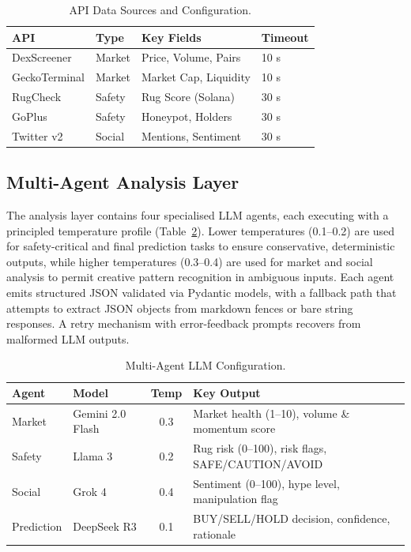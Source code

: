 \documentclass[12pt,a4paper,oneside,openany]{book}
\begin{document}
\begin{table}[H]
\centering
\caption{API Data Sources and Configuration.}
\label{tab:api}
\begin{tabular}{@{}llll@{}}
\toprule
\textbf{API} & \textbf{Type} & \textbf{Key Fields} & \textbf{Timeout} \\
\midrule
DexScreener & Market & Price, Volume, Pairs & 10 s \\
GeckoTerminal & Market & Market Cap, Liquidity & 10 s \\
RugCheck & Safety & Rug Score (Solana) & 30 s \\
GoPlus & Safety & Honeypot, Holders & 30 s \\
Twitter v2 & Social & Mentions, Sentiment & 30 s \\
\bottomrule
\end{tabular}
\end{table}

\subsection{Multi-Agent Analysis Layer}
The analysis layer contains four specialised LLM agents, each executing with a principled temperature profile (Table~\ref{tab:agents}). Lower temperatures (0.1--0.2) are used for safety-critical and final prediction tasks to ensure conservative, deterministic outputs, while higher temperatures (0.3--0.4) are used for market and social analysis to permit creative pattern recognition in ambiguous inputs. Each agent emits structured JSON validated via Pydantic models, with a fallback path that attempts to extract JSON objects from markdown fences or bare string responses. A retry mechanism with error-feedback prompts recovers from malformed LLM outputs.

\begin{table}[H]
\centering
\caption{Multi-Agent LLM Configuration.}
\label{tab:agents}
\begin{tabular}{@{}llcp{6cm}@{}}
\toprule
\textbf{Agent} & \textbf{Model} & \textbf{Temp} & \textbf{Key Output} \\
\midrule
Market     & Gemini 2.0 Flash & 0.3 & Market health (1--10), volume \& momentum score \\
Safety     & Llama 3          & 0.2 & Rug risk (0--100), risk flags, SAFE/CAUTION/AVOID \\
Social     & Grok 4           & 0.4 & Sentiment (0--100), hype level, manipulation flag \\
Prediction & DeepSeek R3      & 0.1 & BUY/SELL/HOLD decision, confidence, rationale \\
\bottomrule
\end{tabular}
\end{table}
\end{document}
